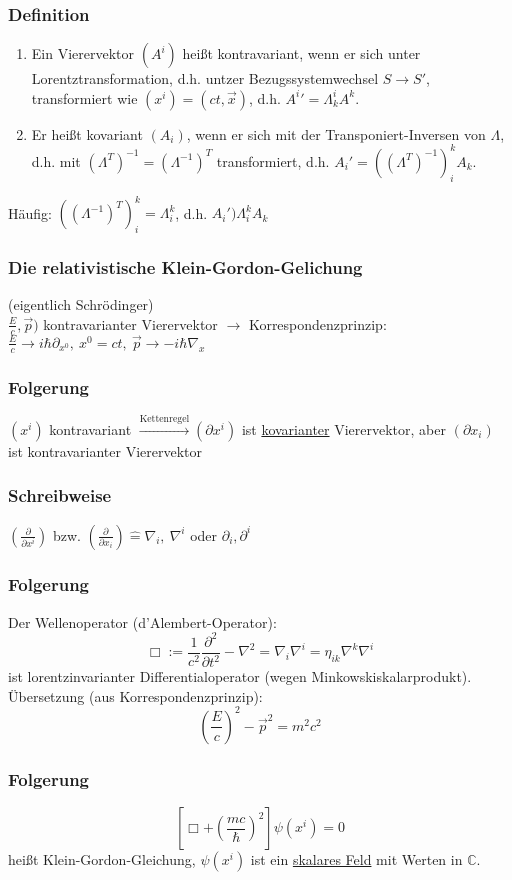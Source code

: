\documentclass[twoside,a4paper]{scrartcl}
\newcommand{\C}{\mathbb{C}}
\renewcommand{\1}{\mathds{1}}
\newcommand{\ra}{\rightarrow}
\newcommand{\entspricht}{\mathrel{\widehat{=}}}
\renewcommand{\L}{\Lambda}
\renewcommand{\C}{\mathbb{C}}
\begin{document}
\subsubsection*{Definition}
\begin{enumerate}
\item Ein Vierervektor $(A^i)$ heißt kontravariant, wenn er sich unter Lorentztransformation, d.h. untzer Bezugssystemwechsel $S \ra S'$, transformiert wie $(x^i)=(ct,\vec x)$, d.h. ${A^i}'=\L_k^iA^k$.
\item Er heißt kovariant $(A_i)$, wenn er sich mit der Transponiert-Inversen von $\L$, d.h. mit $(\L^T)^{-1}=(\L^{-1})^T$ transformiert, d.h. $A_i'=((\L^T)^{-1})^k_i A_k$.
\end{enumerate}
Häufig:
$((\L^{-1})^T)^k_i=\L_i^k$, d.h. $A_i') \L_i^k A_k$
\subsubsection{Die relativistische Klein-Gordon-Gelichung}
(eigentlich Schrödinger)\\
$\frac{E}{c}, \vec p)$ kontravarianter Vierervektor $\ra$ Korrespondenzprinzip:\\ $\frac{E}{c} \ra i\hbar \partial_{x^0}, \ x^0=ct, \ \vec p \ra -i \hbar \nabla_x$
\subsubsection*{Folgerung}
$(x^i)$ kontravariant $\stackrel{\mathrm{Kettenregel}}{\ra} (\partial x^i)$ ist \underline{kovarianter} Vierervektor, aber $(\partial x_i)$ ist kontravarianter Vierervektor
\subsubsection*{Schreibweise}
$(\frac{\partial}{\partial x^i})$ bzw. $(\frac{\partial}{\partial x_i})\entspricht \nabla_i, \ \nabla^i$ oder $\partial_i,\partial^i$
\subsubsection*{Folgerung}
Der Wellenoperator (d'Alembert-Operator):
$$\Box:= \frac{1}{c^2} \frac{\partial^2}{\partial t^2}-\nabla^2=\nabla_i\nabla^i=\eta_{ik} \nabla^k \nabla^i$$
ist lorentzinvarianter Differentialoperator (wegen Minkowskiskalarprodukt).\\
Übersetzung (aus Korrespondenzprinzip):
$$(\frac{E}{c})^2-\vec p^2=m^2c^2$$
\subsubsection*{Folgerung}
$$[\Box+(\frac{mc}{\hbar})^2] \psi(x^i)=0$$
heißt Klein-Gordon-Gleichung, $\psi(x^i)$ ist ein \underline{skalares Feld} mit Werten in $\C$.
\end{document}

